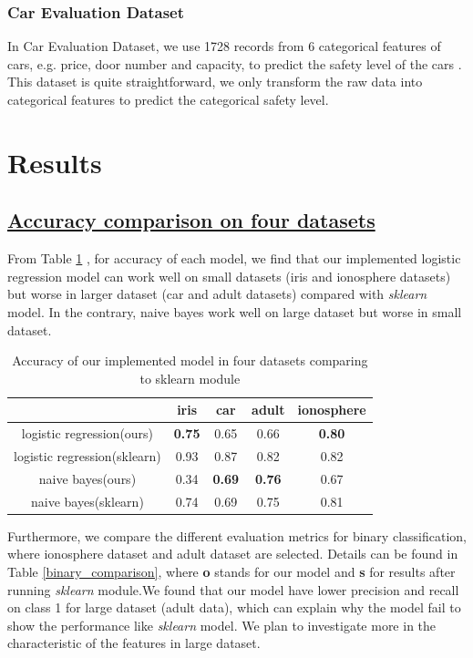 \documentclass[11pt]{scrartcl}
\begin{document}
\subsubsection*{Car Evaluation Dataset}
In Car Evaluation Dataset, we use 1728 records from 6 categorical features of cars, e.g. price, door number and capacity, to predict the safety level of the cars \cite{bohanec1988knowledge}. This dataset is quite straightforward, we only transform the raw data into categorical features to predict the categorical safety level.


\section{Results}
\subsection*{\underline{Accuracy comparison on four datasets}}

From Table \ref{accuracy_fourdata} , for accuracy of each model, we find that our implemented logistic regression model can work well on small datasets (iris and ionosphere datasets) but worse in larger dataset (car and adult datasets) compared with \textit{sklearn} model. In the contrary, naive bayes work well on large dataset but worse in small dataset.

\begin{table}[H]
	\centering
	\begin{tabular}{c|cccc}
		\hline
		 & iris	 & car & adult & ionosphere \\
		\hline
		logistic regression(ours) &  \textbf{0.75} & 0.65 & 0.66 & \textbf{0.80}\\
		logistic regression(sklearn) & 0.93 & 0.87 & 0.82 & 0.82\\
		naive bayes(ours) & 0.34 &  \textbf{0.69} & \textbf{0.76} & 0.67 \\
		naive bayes(sklearn) & 0.74 & 0.69 & 0.75 & 0.81 \\
		\hline
	\end{tabular} 
	\caption{Accuracy of our implemented model in four datasets comparing to sklearn module}
	\label{accuracy_fourdata}
\end{table}

Furthermore, we compare the different evaluation metrics for binary classification, where ionosphere dataset and adult dataset are selected. Details can be found in Table \ref{binary_comparison}, where \textbf{o} stands for our model and \textbf{s} for results after running \textit{sklearn} module.We found that our model have lower precision and recall on class 1 for large dataset (adult data), which can explain why the model fail to show the performance like \textit{sklearn} model. We plan to investigate more in the characteristic of the features in large dataset.
\end{document}
